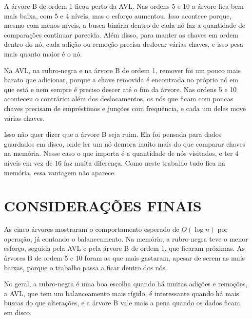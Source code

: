 A árvore B de ordem 1 ficou perto da AVL. Nas ordens 5 e 10 a árvore fica bem mais baixa, com 5 e 4 níveis, mas o esforço aumentou. Isso acontece porque, mesmo com menos níveis, a busca binária dentro de cada nó faz a quantidade de comparações continuar parecida. Além disso, para manter as chaves em ordem dentro do nó, cada adição ou remoção precisa deslocar várias chaves, e isso pesa mais quanto maior é o nó.

Na AVL, na rubro-negra e na árvore B de ordem 1, remover foi um pouco mais barato que adicionar, porque a chave removida é encontrada no próprio nó em que está e nem sempre é preciso descer até o fim da árvore. Nas ordens 5 e 10 aconteceu o contrário: além dos deslocamentos, os nós que ficam com poucas chaves precisam de empréstimos e junções com frequência, e cada um deles move várias chaves.

Isso não quer dizer que a árvore B seja ruim. Ela foi pensada para dados guardados em disco, onde ler um nó demora muito mais do que comparar chaves na memória. Nesse caso o que importa é a quantidade de nós visitados, e ter 4 níveis em vez de 16 faz muita diferença. Como neste trabalho tudo fica na memória, essa vantagem não aparece.

\section{CONSIDERAÇÕES FINAIS}

As cinco árvores mostraram o comportamento esperado de $O(\log n)$ por operação, já contando o balanceamento. Na memória, a rubro-negra teve o menor esforço, seguida pela AVL e pela árvore B de ordem 1, que ficaram próximas. As árvores B de ordem 5 e 10 foram as que mais gastaram, apesar de serem as mais baixas, porque o trabalho passa a ficar dentro dos nós.

No geral, a rubro-negra é uma boa escolha quando há muitas adições e remoções, a AVL, que tem um balanceamento mais rígido, é interessante quando há mais buscas do que alterações, e a árvore B vale mais a pena quando os dados ficam em disco.